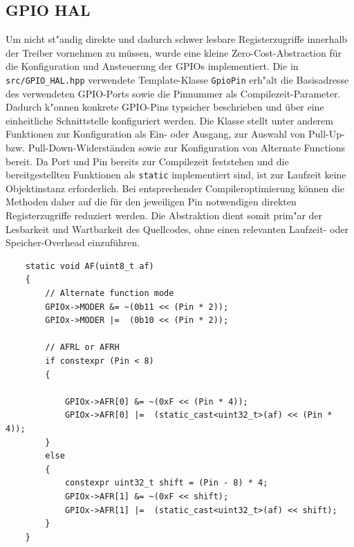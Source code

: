 \documentclass[11pt]{article}
\newcommand{\cpp}[1]{\texttt{#1}}
\begin{document}
\subsection{GPIO HAL}
Um nicht st"andig direkte und dadurch schwer lesbare Registerzugriffe
 innerhalb der Treiber vornehmen zu müssen, wurde eine kleine Zero-Cost-Abstraction
für die Konfiguration und Ansteuerung der GPIOs implementiert.
Die in \texttt{src/GPIO\_HAL.hpp} verwendete Template-Klasse \cpp{GpioPin} 
erh"alt die Basisadresse des verwendeten GPIO-Ports sowie die Pinnummer als Compilezeit-Parameter. 
Dadurch k"onnen konkrete GPIO-Pins typsicher beschrieben
und über eine einheitliche Schnittstelle konfiguriert werden.
Die Klasse stellt unter anderem Funktionen zur Konfiguration als Ein- oder Ausgang, 
zur Auswahl von Pull-Up- bzw. Pull-Down-Widerständen sowie zur Konfiguration von Alternate Functions bereit.
Da Port und Pin bereits zur Compilezeit feststehen und die bereitgestellten Funktionen als \cpp{static} implementiert sind,
ist zur Laufzeit keine Objektinstanz erforderlich. 
Bei entsprechender Compileroptimierung können die Methoden daher auf die für den jeweiligen Pin notwendigen direkten Registerzugriffe reduziert werden. 
Die Abstraktion dient somit prim"ar der Lesbarkeit und Wartbarkeit des Quellcodes, ohne einen relevanten Laufzeit- oder Speicher-Overhead einzuführen.
\begin{listing}[H]
    \begin{verbatim}
    static void AF(uint8_t af)
    {
        // Alternate function mode
        GPIOx->MODER &= ~(0b11 << (Pin * 2));
        GPIOx->MODER |=  (0b10 << (Pin * 2));

        // AFRL or AFRH
        if constexpr (Pin < 8)
        {   
            
            GPIOx->AFR[0] &= ~(0xF << (Pin * 4));
            GPIOx->AFR[0] |=  (static_cast<uint32_t>(af) << (Pin * 4));
        }
        else
        {
            constexpr uint32_t shift = (Pin - 8) * 4;
            GPIOx->AFR[1] &= ~(0xF << shift);
            GPIOx->AFR[1] |=  (static_cast<uint32_t>(af) << shift);
        }
    }
    \end{verbatim}
\caption{if constexpr bei der Alternate Function Implementation}
\label{listing:AF}
\end{listing}
\end{document}
